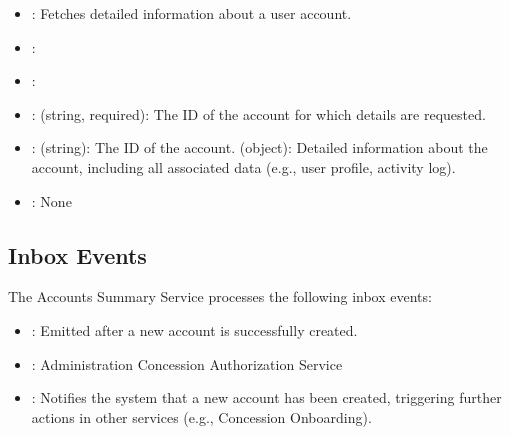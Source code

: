 \documentclass[letterpaper,10pt,english]{sphinxmanual}
\begin{document}
\sphinxAtStartPar
{}
\begin{itemize}
\item {} 
\sphinxAtStartPar
{}: Fetches detailed information about a user account.

\item {} 
\sphinxAtStartPar
{}: 

\item {} 
\sphinxAtStartPar
{}: 

\item {} 
\sphinxAtStartPar
{}:
\sphinxhyphen{}  (string, required): The ID of the account for which details are requested.

\item {} 
\sphinxAtStartPar
{}:
\sphinxhyphen{}  (string): The ID of the account.
\sphinxhyphen{}  (object): Detailed information about the account, including all associated data (e.g., user profile, activity log).

\item {} 
\sphinxAtStartPar
{}: None

\end{itemize}


\subsection{Inbox Events}
\label{\detokenize{administration_concession_system/accounts_summary_service:inbox-events}}
\sphinxAtStartPar
The Accounts Summary Service processes the following inbox events:

\sphinxAtStartPar
{}
\begin{itemize}
\item {} 
\sphinxAtStartPar
{}: Emitted after a new account is successfully created.

\item {} 
\sphinxAtStartPar
{}: Administration Concession Authorization Service

\item {} 
\sphinxAtStartPar
{}: Notifies the system that a new account has been created, triggering further actions in other services (e.g., Concession Onboarding).

\end{itemize}
\end{document}
